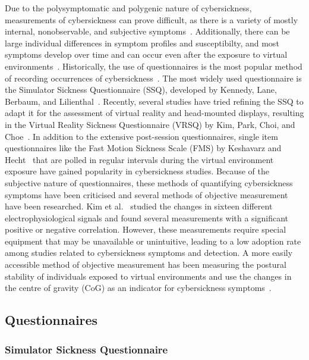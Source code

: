 Due to the polysymptomatic and polygenic nature of cybersickness, measurements of cybersickness can prove
difficult, as there is a variety of mostly internal, nonobservable, and subjective symptoms~\cite{McCauley1992}.
Additionally, there can be large individual differences in symptom profiles and susceptibilty, and most symptoms
develop over time and can occur even after the exposure to virtual environments~\cite{McCauley1992}.
Historically, the use of questionnaires is the most popular method of recording occurrences of
cybersickness~\cite{Rebenitsch2016,Saredakis2020}.
The most widely used questionnaire is the Simulator Sickness Questionnaire (SSQ), developed by Kennedy, Lane, Berbaum,
and Lilienthal~\cite{Kennedy1993}.
Recently, several studies have tried refining the SSQ to adapt it for the assessment of virtual reality and
head-mounted displays, resulting in the Virtual Reality Sickness Questionnaire (VRSQ) by Kim, Park, Choi, and
Choe~\cite{Kim2018}.
In addition to the extensive post-session questionnaires, single item questionnaires like the Fast Motion Sickness
Scale (FMS) by Keshavarz and Hecht~\cite{Keshavarz2011} that are polled in regular intervals during the virtual
environment exposure have gained popularity in cybersickness studies.
Because of the subjective nature of questionnaires, these methods of quantifying cybersickness symptoms have been
criticised and several methods of objective measurement have been researched.
Kim et al.~\cite{Kim2005} studied the changes in sixteen different electrophysiological signals and found several
measurements with a significant positive or negative correlation.
However, these measurements require special equipment that may be unavailable or unintuitive, leading to a low
adoption rate among studies related to cybersickness symptoms and detection.
A more easily accessible method of objective measurement has been measuring the postural stability of individuals
exposed to virtual environments and use the changes in the centre of gravity (CoG) as an indicator for cybersickness
symptoms~\cite{Lim2020}.


\subsection{Questionnaires}\label{subsec:questionnaires}

\subsubsection{Simulator Sickness Questionnaire}\label{subsubsec:simulator-sickness-questionnaire}


